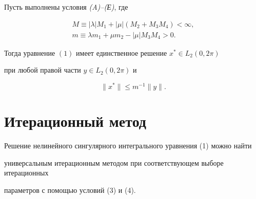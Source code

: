 \begin{thm}


Пусть выполнены условия {\em (A)--(Е)}, где


\begin{gather}


M\equiv |\lambda|M_1+|\mu|(M_2+M_3M_4)<\infty,\\


%


m\equiv \lambda m_1+\mu m_2-|\mu|M_3M_4>0.


\end{gather}


Тогда уравнение $(1)$ имеет единственное решение $x^*\in L_2(0,2\pi)$


при любой правой части $y\in L_2(0,2\pi)$ и


\begin{equation}


\|x^*\|\leq m^{-1} \|y\|.


\end{equation}


\end{thm}





\section{Итерационный метод}





Решение нелинейного сингулярного интегрального уравнения (1) можно найти


универсальным итерационным методом при соответствующем выборе итерационных


параметров с помощью условий (3) и (4).





